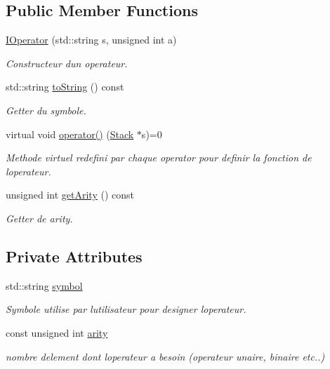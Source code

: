 \subsection*{Public Member Functions}
\begin{DoxyCompactItemize}
\item 
\hyperlink{class_i_operator_a7f4ccd20d66e911bcbbabcaf3fe2feec}{I\+Operator} (std\+::string s, unsigned int a)
\begin{DoxyCompactList}\small\item\em Constructeur d\textquotesingle{}un operateur. \end{DoxyCompactList}\item 
std\+::string \hyperlink{class_i_operator_a919ce3837a343f2fed1bca27e3f180e1}{to\+String} () const 
\begin{DoxyCompactList}\small\item\em Getter du symbole. \end{DoxyCompactList}\item 
virtual void \hyperlink{class_i_operator_ab93ebb15195290da26e2f3e626f6f25e}{operator()} (\hyperlink{class_stack}{Stack} $\ast$s)=0
\begin{DoxyCompactList}\small\item\em Methode virtuel redefini par chaque operator pour definir la fonction de l\textquotesingle{}operateur. \end{DoxyCompactList}\item 
unsigned int \hyperlink{class_i_operator_a2dcc556787602da06860294ad263c7a9}{get\+Arity} () const 
\begin{DoxyCompactList}\small\item\em Getter de arity. \end{DoxyCompactList}\end{DoxyCompactItemize}
\subsection*{Private Attributes}
\begin{DoxyCompactItemize}
\item 
std\+::string \hyperlink{class_i_operator_a8864ad399243cadd79da18130ca766d9}{symbol}\hypertarget{class_i_operator_a8864ad399243cadd79da18130ca766d9}{}\label{class_i_operator_a8864ad399243cadd79da18130ca766d9}

\begin{DoxyCompactList}\small\item\em Symbole utilise par l\textquotesingle{}utilisateur pour designer l\textquotesingle{}operateur. \end{DoxyCompactList}\item 
const unsigned int \hyperlink{class_i_operator_a0ac9d0762ea8f32d9e2e5c79327187c7}{arity}\hypertarget{class_i_operator_a0ac9d0762ea8f32d9e2e5c79327187c7}{}\label{class_i_operator_a0ac9d0762ea8f32d9e2e5c79327187c7}

\begin{DoxyCompactList}\small\item\em nombre d\textquotesingle{}element dont l\textquotesingle{}operateur a besoin (operateur unaire, binaire etc..) \end{DoxyCompactList}\end{DoxyCompactItemize}


